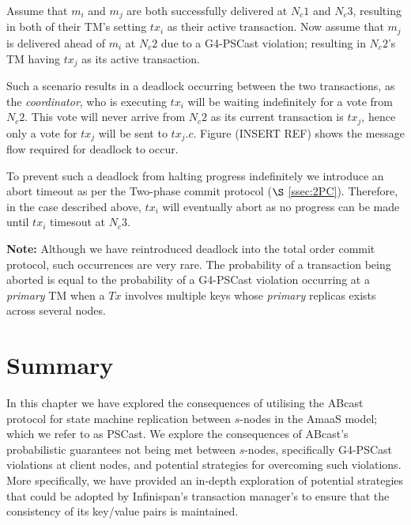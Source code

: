     Assume that $m_i$ and $m_j$ are both successfully delivered at $N_c1$ and $N_c3$, resulting in both of their TM's setting $tx_i$ as their active transaction.  Now assume that $m_j$ is delivered ahead of $m_i$ at $N_c2$ due to a G4-PSCast violation;  resulting in $N_c2$'s TM having $tx_j$ as its active transaction.  
    
    Such a scenario results in a deadlock occurring between the two transactions, as the \emph{coordinator}, who is executing $tx_i$ will be waiting indefinitely for a vote from $N_c2$.  This vote will never arrive from $N_c2$ as its current transaction is $tx_j$, hence only a vote for $tx_j$ will be sent to $tx_j.c$.  Figure (INSERT REF) shows the message flow required for deadlock to occur.  
    
    To prevent such a deadlock from halting progress indefinitely we introduce an abort timeout as per the Two-phase commit protocol ($\S$ \ref{ssec:2PC}).  Therefore, in the case described above, $tx_i$ will eventually abort as no progress can be made until $tx_i$ timesout at $N_c3$.
    
    \textbf{Note:} Although we have reintroduced deadlock into the total order commit protocol, such occurrences are very rare.  The probability of a transaction being aborted is equal to the probability of a G4-PSCast violation occurring at a \emph{primary} TM when a $Tx$ involves multiple keys whose \emph{primary} replicas exists across several nodes.  

\section{Summary}
In this chapter we have explored the consequences of utilising the \textsf{ABcast} protocol for state machine replication between $s$-nodes in the \textsf{AmaaS} model; which we refer to as \textsf{PSCast}.  We explore the consequences of \textsf{ABcast}'s probabilistic guarantees not being met between $s$-nodes, specifically G4-PSCast violations at client nodes, and potential strategies for overcoming such violations.  More specifically, we have provided an in-depth exploration of potential strategies that could be adopted by Infinispan's transaction manager's to ensure that the consistency of its key/value pairs is maintained.  